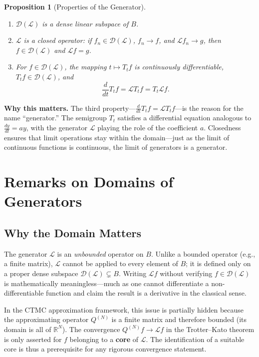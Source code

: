 \documentclass[11pt,a4paper,openany]{book}
\theoremstyle{definition}
\theoremstyle{plain}
\newtheorem{proposition}[theorem]{Proposition}
\theoremstyle{remark}
\newcommand{\1}{\mathbbm{1}}
\newcommand{\R}{\mathbb{R}}
\newcommand{\calL}{\mathcal{L}}
\newcommand{\calD}{\mathcal{D}}
\begin{document}
\begin{proposition}[Properties of the Generator]
\begin{enumerate}[label=(\arabic*)]
    \item $\calD(\calL)$ is a dense linear subspace of $B$.
    \item $\calL$ is a closed operator: if $f_{n} \in \calD(\calL)$, $f_{n} \to f$, and $\calL f_{n} \to g$, then $f \in \calD(\calL)$ and $\calL f = g$.
    \item For $f \in \calD(\calL)$, the mapping $t \mapsto T_{t} f$ is continuously differentiable, $T_{t} f \in \calD(\calL)$, and
    \[
    \frac{d}{dt} T_{t} f = \calL T_{t} f = T_{t} \calL f.
    \]
\end{enumerate}
\end{proposition}

\medskip
\noindent\textbf{Why this matters.} The third property---$\frac{d}{dt} T_t f = \mathcal{L} T_t f$---is the reason for the name ``generator.'' The semigroup $T_t$ satisfies a differential equation analogous to $\frac{dy}{dt} = ay$, with the generator $\mathcal{L}$ playing the role of the coefficient $a$. Closedness ensures that limit operations stay within the domain---just as the limit of continuous functions is continuous, the limit of generators is a generator.

\section{Remarks on Domains of Generators}

\subsection{Why the Domain Matters}

The generator $\mathcal{L}$ is an \emph{unbounded} operator on $B$. Unlike a bounded operator (e.g., a finite matrix), $\mathcal{L}$ cannot be applied to every element of $B$; it is defined only on a proper dense subspace $\mathcal{D}(\mathcal{L}) \subsetneq B$. Writing $\mathcal{L} f$ without verifying $f \in \mathcal{D}(\mathcal{L})$ is mathematically meaningless---much as one cannot differentiate a non-differentiable function and claim the result is a derivative in the classical sense.

In the CTMC approximation framework, this issue is partially hidden because the approximating operator $Q^{(N)}$ is a finite matrix and therefore bounded (its domain is all of $\R^{N}$). The convergence $Q^{(N)} f \to \mathcal{L} f$ in the Trotter--Kato theorem is only asserted for $f$ belonging to a \textbf{core} of $\mathcal{L}$. The identification of a suitable core is thus a prerequisite for any rigorous convergence statement.
\end{document}
